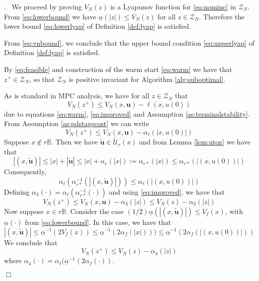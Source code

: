 \documentclass{article}
\newenvironment{proof}{\noindent {\em Proof}.\ }{\hspace*{\fill}$\Box$\medskip\\}
\newcommand{\abs}[1]{\left\lvert #1 \right\rvert}
\begin{document}
\begin{proof}
We proceed by proving $V_N(z)$ is a Lyapunov function for \eqref{eq:nominc} in $\mathcal{Z}_N$.
From \eqref{eq:lowerbound} we have $\underline{\alpha}(\abs{z})
\leq V_N(z)$ for all $z \in \mathcal{Z}_N$. Therefore the lower bound
\eqref{eq:lowerlyap} of Definition \ref{def:lyap} is satisfied.

From \eqref{eq:vnbound}, we conclude that the upper bound condition 
\eqref{eq:upperlyap} of Definition \ref{def:lyap} is satisfied.

By \eqref{eq:feasible} and construction of the warm start \eqref{eq:warm} we have that
$z^+ \in \mathcal{Z}_N$, so that $\mathcal{Z}_N$ is positive invariant for Algorithm \ref{alg:suboptimal}.

As is standard in MPC analysis, we have for all $z \in \mathcal{Z}_N$ that 
\begin{equation*}
V_N(z^+) \leq V_N(x,\mathbf{u}) - \ell(x,u(0))
\end{equation*} 
due to equations \eqref{eq:warm}, \eqref{eq:improved} and Assumption
\ref{as:terminalstability}.
From Assumption \ref{as:pdstagecost} we can write 
\begin{equation*}
V_N(z^+) \leq V_N(x,\mathbf{u}) - \alpha_\ell(\abs{x,u(0)})
\end{equation*}
Suppose $x \notin r\mathbb{B}$. Then we have $\tilde{\mathbf{u}} \in \tilde{\mathcal{U}}_r(x)$ and from Lemma 
\ref{lem:utox} we have that 
\begin{equation*}
\abs{(x,\tilde{\mathbf{u}})} \leq \abs{x} + \abs{\tilde{\mathbf{u}}} \leq \abs{x} + \alpha_r(\abs{x}) := 
\alpha_{r*}(\abs{x}) \leq \alpha_{r*}(\abs{(x,u(0))})
\end{equation*}
Consequently,
\begin{equation*}
\alpha_\ell(\alpha_{r*}^{-1}(\abs{(x,\tilde{\mathbf{u}})})) \leq  \alpha_\ell(\abs{(x,u(0))})
\end{equation*}
Defining $\alpha_3(\cdot) = \alpha_\ell(\alpha_{r*}^{-1}(\cdot))$ and using \eqref{eq:improved}, we have
that
\begin{equation*}
V_N(z^+) \leq V_N(x,\mathbf{u}) - \alpha_3(\abs{z}) \leq V_N(z) - \alpha_3(\abs{z})
\end{equation*}
Now suppose $x \in r\mathbb{B}$. Consider the case $(1/2)\underline{\alpha}
(\abs{(x,\tilde{\mathbf{u}})}) \leq V_f(x)$, with $\underline{\alpha}(\cdot)$ from \eqref{eq:lowerbound}.
In this case, we have that
\begin{equation*}
\abs{(x,\tilde{\mathbf{u}})} \leq \underline{\alpha}^{-1}(2V_f(x)) \leq 
\underline{\alpha}^{-1}(2\alpha_f(\abs{x}))) \leq \underline{\alpha}^{-1}(2\alpha_f(\abs{(x,u(0))}))
\end{equation*}
We conclude that 
\begin{equation*}
V_N(z^+) \leq V_N(z) - \alpha_4(\abs{z})
\end{equation*}
where $\alpha_4(\cdot) = \alpha_\ell(\underline{\alpha}^{-1}(2\alpha_f(\cdot))$.


\end{proof}
\end{document}
